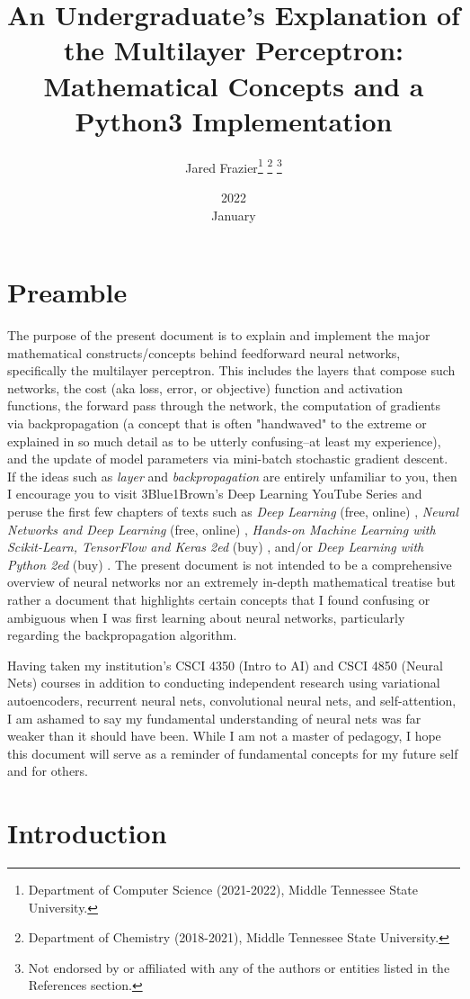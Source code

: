 \documentclass{article}
\title{
	An Undergraduate's Explanation of the Multilayer Perceptron: 
	Mathematical Concepts and a Python3 Implementation}
\date{2022 \\ January}
\author{Jared Frazier\thanks{Department of Computer Science (2021-2022),
Middle Tennessee State University.} \thanks{Department of Chemistry (2018-2021),
Middle Tennessee State University.} \thanks{Not endorsed by or affiliated with any of the 
authors or entities listed in the References section.}}
\begin{document}
\maketitle
\titlepage

\section{Preamble}
\quad The purpose of the present document is to explain and implement the major mathematical
constructs/concepts behind feedforward neural networks, specifically the multilayer perceptron.
This includes the layers that compose such networks, the cost (aka loss, error, or objective) function
and activation functions, the forward pass through the network,
the computation of gradients via backpropagation (a concept that is often "handwaved" to the extreme
or explained in so much detail as to be utterly confusing--at least my experience),
and the update of model parameters via mini-batch stochastic gradient descent.
If the ideas such as \textit{layer} and \textit{backpropagation} are entirely unfamiliar
to you, then I encourage you to visit 3Blue1Brown's Deep Learning YouTube Series \cite{3Blue1BrownWhatIsANN2017}
and peruse the first few chapters of texts such as \textit{Deep Learning} (free, online) \cite{Goodfellow2016},
\textit{Neural Networks and Deep Learning} (free, online) \cite{Nielsen2015},
\textit{Hands-on Machine Learning with Scikit-Learn, TensorFlow and Keras 2ed} (buy) \cite{Geron2020},
and/or \textit{Deep Learning with Python 2ed} (buy) \cite{Chollet2021}. The present document
is not intended to be a comprehensive overview of neural networks nor an extremely
in-depth mathematical treatise but rather a document that highlights certain concepts that
I found confusing or ambiguous when I was first learning about neural networks,
particularly regarding the backpropagation algorithm.

Having taken my institution's CSCI 4350 (Intro to AI) and CSCI 4850 (Neural Nets)
courses in addition to conducting independent research using
variational autoencoders, recurrent neural nets, convolutional neural nets, and
self-attention, I am ashamed to say my fundamental understanding of neural nets
was far weaker than it should have been. While I am not a master of pedagogy,
I hope this document will serve as a reminder of fundamental concepts for my
future self and for others.

\section{Introduction}
\end{document}
